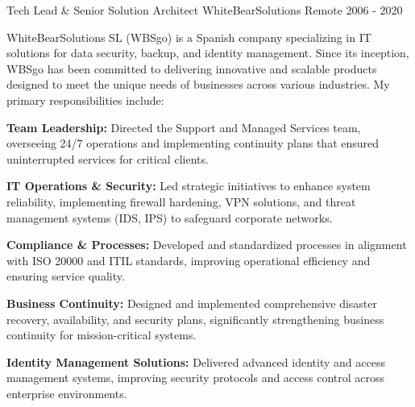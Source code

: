 \documentclass[11pt, a4paper]{awesome-cv}
\begin{document}
\begin{cventries}
    \cventry
    {Tech Lead \& Senior Solution Architect} %
    {WhiteBearSolutions} %
    {Remote} %
    {2006 - 2020} %
    {
    	WhiteBearSolutions SL (WBSgo) is a Spanish company specializing in IT solutions for data security, backup, and identity management. Since its inception, WBSgo has been committed to delivering innovative and scalable products designed to meet the unique needs of businesses across various industries. My primary responsibilities include:
    	\vspace{15pt}
    	\begin{cvitems} %
		    \item \textbf{Team Leadership:} Directed the Support and Managed Services team, overseeing 24/7 operations and implementing continuity plans that ensured uninterrupted services for critical clients.
		    \item \textbf{IT Operations \& Security:} Led strategic initiatives to enhance system reliability, implementing firewall hardening, VPN solutions, and threat management systems (IDS, IPS) to safeguard corporate networks.
		    \item \textbf{Compliance \& Processes:} Developed and standardized processes in alignment with ISO 20000 and ITIL standards, improving operational efficiency and ensuring service quality.
		    \item \textbf{Business Continuity:} Designed and implemented comprehensive disaster recovery, availability, and security plans, significantly strengthening business continuity for mission-critical systems.
		    \item \textbf{Identity Management Solutions:} Delivered advanced identity and access management systems, improving security protocols and access control across enterprise environments.
    	\end{cvitems}
    }


\end{cventries}
\end{document}
